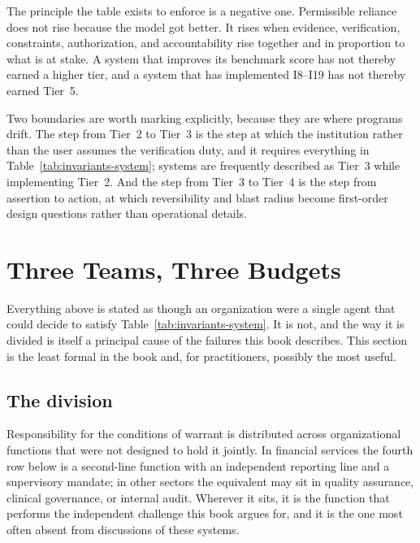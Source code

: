 The principle the table exists to enforce is a negative one. Permissible reliance
does not rise because the model got better. It rises when evidence, verification,
constraints, authorization, and accountability rise together and in proportion to
what is at stake. A system that improves its benchmark score has not thereby earned
a higher tier, and a system that has implemented I8--I19 has not thereby earned
Tier~5.

Two boundaries are worth marking explicitly, because they are where programs
drift. The step from Tier~2 to Tier~3 is the step at which the institution rather
than the user assumes the verification duty, and it requires everything in
Table~\ref{tab:invariants-system}; systems are frequently described as Tier~3 while
implementing Tier~2. And the step from Tier~3 to Tier~4 is the step from assertion
to action, at which reversibility and blast radius become first-order design
questions rather than operational details.

\section{Three Teams, Three Budgets}
\label{sec:three-teams}

Everything above is stated as though an organization were a single agent that could
decide to satisfy Table~\ref{tab:invariants-system}. It is not, and the way it is
divided is itself a principal cause of the failures this book describes. This
section is the least formal in the book and, for practitioners, possibly the most
useful.

\subsection{The division}

Responsibility for the conditions of warrant is distributed across organizational
functions that were not designed to hold it jointly. In financial services the fourth
row below is a second-line function with an independent reporting line and a
supervisory mandate; in other sectors the equivalent may sit in quality assurance,
clinical governance, or internal audit. Wherever it sits, it is the function that
performs the independent challenge this book argues for, and it is the one most often
absent from discussions of these systems.

